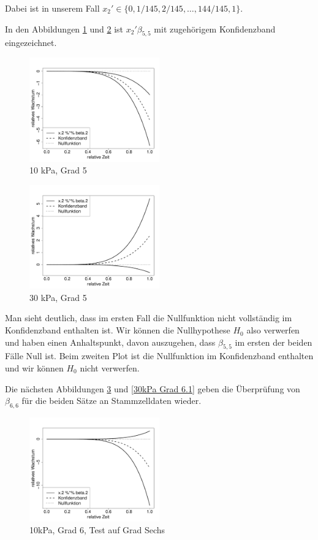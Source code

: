 \documentclass[12pt,a4paper]{article}
\theoremstyle{definition}
\theoremstyle{definition}
\theoremstyle{definition}
\theoremstyle{definition}
\begin{document}
Dabei ist in unserem Fall $x_2' \in \{0, 1/145, 2/145, \ldots, 144/145, 1 \}.$ 

In den Abbildungen \ref{10kPa Grad 5} und \ref{30kPa Grad 5} ist $x_2' \beta_{5,5}$ mit zugehörigem Konfidenzband eingezeichnet.

\begin{figure}[H] 
  \centering
     \includegraphics[width=0.5\textwidth]{10kPa-Grad-5-KB}
  \caption{10 kPa, Grad 5}
  \label{10kPa Grad 5}
\end{figure}

\begin{figure}[H] 
  \centering
     \includegraphics[width=0.5\textwidth]{30kPa-Grad-5-KB}
  \caption{30 kPa, Grad 5}
  \label{30kPa Grad 5}
\end{figure}

Man sieht deutlich, dass im ersten Fall die Nullfunktion nicht vollständig im Konfidenzband enthalten ist. Wir können die Nullhypothese $H_0$ also verwerfen und haben einen Anhaltspunkt, davon auszugehen, dass $\beta_{5,5}$ im ersten der beiden Fälle Null ist. Beim zweiten Plot ist die Nullfunktion im Konfidenzband enthalten und wir können $H_0$ nicht verwerfen.

Die nächsten Abbildungen \ref{10kPa Grad 6.1} und \ref{30kPa Grad 6.1} geben  die Überprüfung von $\beta_{6,6}$ für die beiden Sätze an Stammzelldaten wieder.

\begin{figure}[H] 
  \centering
     \includegraphics[width=0.5\textwidth]{10kPa-Grad-6-1-KB}
  \caption{10kPa, Grad 6, Test auf Grad Sechs}
  \label{10kPa Grad 6.1}
\end{figure}
\end{document}
